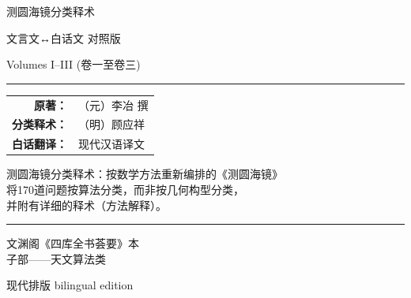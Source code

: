 \documentclass[11pt,a4paper]{article}
\newcommand{\shortline}{\noindent\rule{0.5\textwidth}{0.4pt}\par}
\begin{document}
\thispagestyle{empty}
\begin{center}
\vspace*{1.5cm}

{\fontsize{32}{40}\selectfont\CJKfamily{}
\textcolor{titlecolor}{测圆海镜分类释术}}

\vspace{0.8cm}
{\Large\textcolor{sectioncolor}{文言文↔白话文 对照版}}

\vspace{0.5cm}
{\large\textcolor{notecolor}{Volumes I--III (卷一至卷三)}}

\vspace{1.5cm}
\shortline

\vspace{1cm}
{\large
\begin{tabular}{rl}
\textbf{原著：} & （元）李冶 撰 \\
\textbf{分类释术：} & （明）顾应祥 \\
\textbf{白话翻译：} & 现代汉语译文 \\
\end{tabular}
}

\vspace{1.2cm}
{\normalsize\textcolor{notecolor}{%
测圆海镜分类释术：按数学方法重新编排的《测圆海镜》\\[0.3em]
将170道问题按算法分类，而非按几何构型分类，\\[0.3em]
并附有详细的释术（方法解释）。
}}

\vspace{1.5cm}
\shortline

\vspace{0.8cm}
{\normalsize\textcolor{sectioncolor}{%
文渊阁《四库全书荟要》本\\[0.3em]
子部——天文算法类}}

\vspace{0.8cm}
{\small\textcolor{sectioncolor}{现代排版 bilingual edition}}

\end{center}
\clearpage
\end{document}
